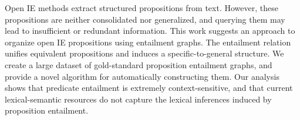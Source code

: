 Open IE methods extract structured propositions from text. However, these propositions are neither consolidated nor generalized, and querying them may lead to insufficient or redundant information. This work suggests an approach to organize open IE propositions using entailment graphs. The entailment relation unifies equivalent propositions and induces a specific-to-general structure. We create a large dataset of gold-standard proposition entailment graphs, and provide a novel algorithm for automatically constructing them. Our analysis shows that predicate entailment is extremely context-sensitive, and that current lexical-semantic resources do not capture the lexical inferences induced by proposition entailment.

